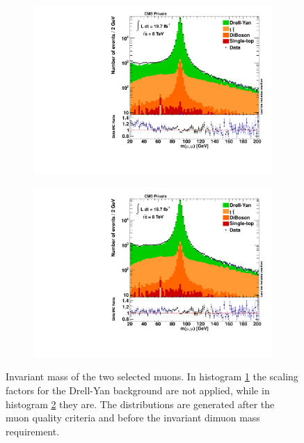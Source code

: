 \begin{figure}[htb!]
  \centering
  \begin{subfigure}[b]{0.495\textwidth}
    \centering
    \includegraphics[width=\textwidth]{plots/m_mumu_zpeak_nodysf.pdf}
    \caption{\label{fig:m_mumu_zpeak_nodysf}}
  \end{subfigure}
  \begin{subfigure}[b]{0.495\textwidth}
    \centering
    \includegraphics[width=\textwidth]{plots/m_mumu_zpeak.pdf}
    \caption{\label{fig:m_mumu_zpeak}}
  \end{subfigure}
  \caption{Invariant mass of the two selected muons. In histogram \ref{fig:m_mumu_zpeak_nodysf} the scaling factors for the Drell-Yan background are not applied, while in histogram \ref{fig:m_mumu_zpeak} they are. The distributions are generated after the muon quality criteria and before the invariant dimuon mass requirement.}
  \label{fig:dyscaling}
\end{figure}

